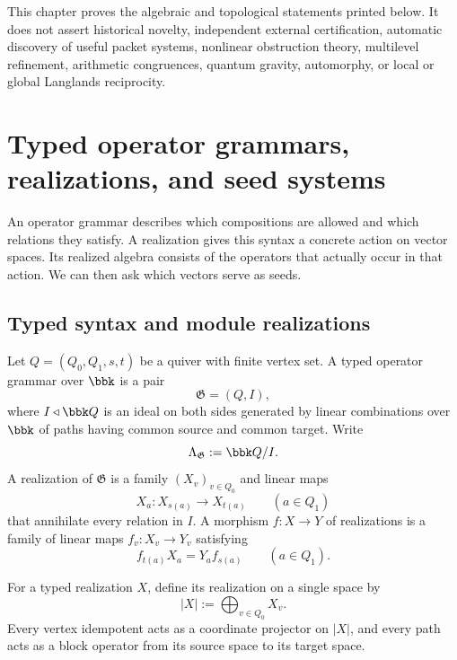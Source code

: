 \begin{boundary}
\label{bnd:symbolic-scope}
This chapter proves the algebraic and topological statements printed below.  It does not assert historical novelty, independent external certification, automatic discovery of useful packet systems, nonlinear obstruction theory, multilevel refinement, arithmetic congruences, quantum gravity, automorphy, or local or global Langlands reciprocity.
\end{boundary}

\section{Typed operator grammars, realizations, and seed systems}
\begin{readerroadmap}
An operator grammar describes which compositions are allowed and which relations they satisfy.  A realization gives this syntax a concrete action on vector spaces.  Its realized algebra consists of the operators that actually occur in that action.  We can then ask which vectors serve as seeds.
\end{readerroadmap}
\subsection{Typed syntax and module realizations}

\begin{definition}
\label{def:typed-grammar}
Let $Q=(Q_0,Q_1,s,t)$ be a quiver with finite vertex set.  A typed operator grammar over $\bbk$ is a pair
\[
\mathfrak G=(Q,I),
\]
where $I\triangleleft \bbk Q$ is an ideal on both sides generated by linear combinations over $\bbk$ of paths having common source and common target.  Write
\[
\Lambda_{\mathfrak G}:=\bbk Q/I.
\]
A realization of $\mathfrak G$ is a family $(X_v)_{v\in Q_0}$ and linear maps
\[
X_a:X_{s(a)}\longrightarrow X_{t(a)}
\qquad(a\in Q_1)
\]
that annihilate every relation in $I$.  A morphism $f:X\to Y$ of realizations is a family of linear maps $f_v:X_v\to Y_v$ satisfying
\[
f_{t(a)}X_a=Y_af_{s(a)}
\qquad(a\in Q_1).
\]
\end{definition}

\begin{definition}
\label{def:collapsed-realization}
For a typed realization $X$, define its realization on a single space by
\[
|X|:=\bigoplus_{v\in Q_0}X_v.
\]
Every vertex idempotent acts as a coordinate projector on $|X|$, and every path acts as a block operator from its source space to its target space.
\end{definition}

